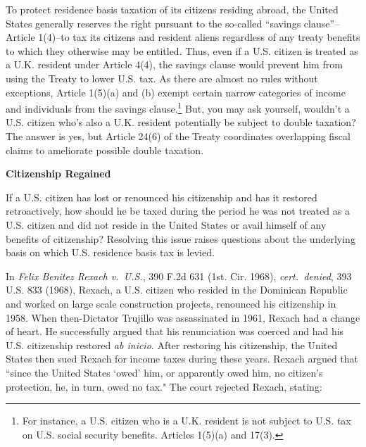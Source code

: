 To protect residence basis taxation of its citizens residing abroad, the United States generally reserves the right pursuant to the so-called ``savings clause''--Article 1(4)--to tax its citizens and resident aliens regardless of any treaty benefits to which they otherwise may be entitled.   Thus, even if a U.S. citizen is treated as a U.K. resident under Article 4(4), the savings clause would prevent him from using the Treaty to lower U.S. tax.  As there are almost no rules without exceptions, Article 1(5)(a) and (b) exempt certain narrow categories of income and individuals from the savings clause.\footnote{For instance, a U.S. citizen who is a U.K. resident is not subject to U.S. tax on U.S. social security benefits. Articles 1(5)(a) and 17(3).} But, you may ask yourself, wouldn't a U.S. citizen who's also a U.K. resident potentially be subject to double taxation? The answer is yes, but Article 24(6) of the Treaty coordinates overlapping fiscal claims to ameliorate possible double taxation.     

  \begin{center}
		\textbf{Citizenship Regained}
			\end{center}

If a U.S. citizen has lost or renounced his citizenship and has it restored retroactively, how should he be taxed during the period he was not treated as a U.S. citizen and did not reside in the United States or avail himself of any benefits of citizenship?  Resolving this issue raises questions about the underlying basis on which U.S. residence basis tax is levied.  

In \textit{Felix Benitez Rexach v.\ U.S.}, 390 F.2d 631 (1st. Cir. 1968), \emph{cert.\ denied}, 393 U.S. 833 (1968), Rexach, a U.S. citizen who resided in the Dominican Republic and worked on large scale construction projects, renounced his citizenship in 1958.  When then-Dictator Trujillo was assassinated in 1961, Rexach had a change of heart.  He successfully argued that his renunciation was coerced and had his U.S. citizenship restored \textit{ab inicio}.  After restoring his citizenship, the United States then sued Rexach for income taxes during these years.  Rexach argued that  ``since the United States `owed' him, or apparently owed him, no citizen's protection, he, in turn, owed no tax."  The court rejected Rexach, stating:

